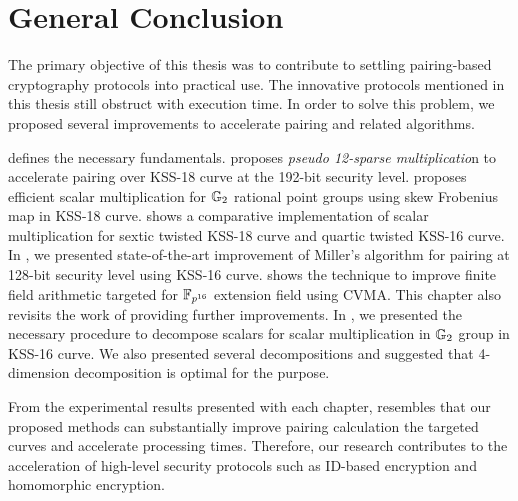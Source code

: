 \chapter{General Conclusion}
\label{ch:general_conclusin}
The primary objective of this thesis was to contribute to settling pairing-based cryptography protocols into practical use.
The innovative protocols mentioned in this thesis still obstruct with execution time.
In order to solve this problem, we proposed several improvements to accelerate pairing and related algorithms.

  defines the necessary fundamentals.
 proposes \textit{pseudo 12-sparse multiplicatio}n to accelerate pairing over KSS-18 curve at the 192-bit security level.
 proposes efficient scalar multiplication for ${\mathbb{G}}_{2}$ rational point groups using skew Frobenius map in KSS-18 curve.
 shows a comparative implementation of scalar multiplication for sextic twisted KSS-18 curve and quartic twisted KSS-16 curve.
In , we presented state-of-the-art improvement of Miller's algorithm for pairing at 128-bit security level using KSS-16 curve.
 shows the technique to improve finite field arithmetic targeted for $\mathbb{F}_{p^{16}}$ extension field using CVMA. This chapter also revisits the work of  providing further improvements.
In , we presented the necessary procedure to decompose scalars for scalar multiplication in ${\mathbb{G}}_{2}$ group in KSS-16 curve.
We also presented several decompositions and suggested that 4-dimension decomposition is optimal for the purpose.

From the experimental results presented with each chapter, resembles that our proposed methods can substantially improve pairing calculation the targeted curves and accelerate processing times.  
Therefore, our research contributes to the acceleration of high-level security protocols such as ID-based encryption and homomorphic encryption.
